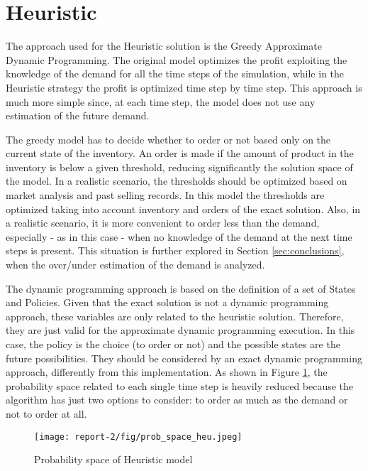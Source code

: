 \documentclass{article}
\begin{document}
\section{Heuristic}\label{sec:heu}
The approach used for the Heuristic solution is the Greedy Approximate Dynamic Programming. The original model optimizes the profit exploiting the knowledge of the demand for all the time steps of the simulation, while in the Heuristic strategy the profit is optimized time step by time step. This approach is much more simple since, at each time step, the model does not use any estimation of the future demand.\par
The greedy model has to decide whether to order or not based only on the current state of the inventory. An order is made if the amount of product in the inventory is below a given threshold, reducing significantly the solution space of the model. In a realistic scenario, the thresholds should be optimized based on market analysis and past selling records. In this model the thresholds are optimized taking into account inventory and orders of the exact solution. Also, in a realistic scenario, it is more convenient to order less than the demand, especially - as in this case - when no knowledge of the demand at the next time steps is present. This situation is further explored in Section \ref{sec:conclusions}, when the over/under estimation of the demand is analyzed. 

The dynamic programming approach is based on the definition of a set of States and Policies. Given that the exact solution is not a dynamic programming approach, these variables are only related to the heuristic solution. Therefore, they are just valid for the approximate dynamic programming execution.
In this case, the policy is the choice (to order or not) and the possible states are the future possibilities. They should be considered by an exact dynamic programming approach, differently from this implementation. 
As shown in Figure \ref{fig:prob_space_heu}, the probability space related to each single time step is heavily reduced because the algorithm has just two options to consider: to order as much as the demand or not to order at all. 

\begin{figure}[!htb]
\vspace{20pt}
    \centering
    \texttt{[image: report-2/fig/prob\_space\_heu.jpeg]}
    \caption{Probability space of Heuristic model}
    \label{fig:prob_space_heu}
\end{figure}
\end{document}
